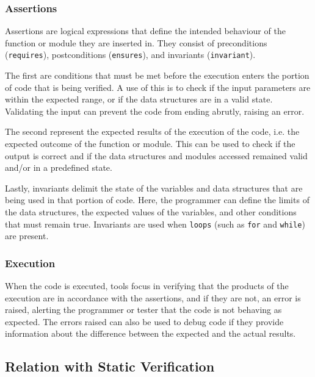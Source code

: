 \subsubsection{Assertions}
\label{subsub:assertions}

Assertions are logical expressions that define the intended behaviour of the 
function or module they are inserted in. They consist of preconditions (\texttt{requires}), 
postconditions (\texttt{ensures}), and invariants (\texttt{invariant}).

The first are conditions that must be met before the execution enters 
the portion of code that is being verified. A use of this is to check if the input 
parameters are within the expected range, or if the data structures are in a valid 
state. Validating the input can prevent the code from ending abrutly, raising an error.

The second represent the expected results of the execution of the code, i.e. the expected 
outcome of the function or module. This can be used to check if the output is correct and 
if the data structures and modules accessed remained valid and/or in a predefined state. 

Lastly, invariants delimit the state of the variables and data structures that are 
being used in that portion of code. Here, the programmer can define the limits of 
the data structures, the expected values of the variables, and other conditions that 
must remain true. Invariants are used when \texttt{loops} (such as \texttt{for} and 
\texttt{while}) are present.

\subsubsection{Execution}
\label{subsub:execution}

When the code is executed, tools focus in verifying that the products of 
the execution are in accordance with the assertions, and if they are not, an error is 
raised, alerting the programmer or tester that the code is not behaving as expected. 
The errors raised can also be used to debug code if they provide information about the 
difference between the expected and the actual results.

\subsection{Relation with Static Verification}
\label{sub:relation_with_static_verification}

